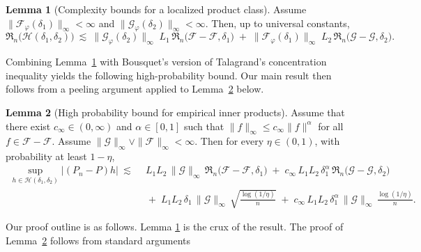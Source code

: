 \documentclass[11pt]{article}
\theoremstyle{plain}
\theoremstyle{definition} %
\newtheorem{lemma}{Lemma}
\begin{document}
\begin{lemma}[Complexity bounds for a localized product class]
\label{lem:nonselfnorm_lipschitz_product}
Assume $\|\mathcal F_{\varphi}(\delta_1)\|_\infty<\infty$ and $\|\mathcal G_{\varphi}(\delta_2)\|_\infty<\infty$.
Then, up to universal constants,
\[
\mathfrak R_n\bigl(\mathcal H(\delta_1,\delta_2)\bigr)
\ \lesssim\
\|\mathcal G_{\varphi}(\delta_2)\|_\infty\; L_1\,\mathfrak R_n\bigl(\mathcal F-\mathcal F,\delta_1\bigr)
\;+\;
\|\mathcal F_{\varphi}(\delta_1)\|_\infty\; L_2\,\mathfrak R_n\bigl(\mathcal G-\mathcal G,\delta_2\bigr).
\]
\end{lemma}

Combining Lemma~\ref{lem:nonselfnorm_lipschitz_product} with Bousquet's version of Talagrand's concentration inequality yields the following high-probability bound. Our main result then follows from a peeling argument applied to Lemma~\ref{lem:fixed_delta_local_conc_lipschitz_product_increments} below.


 
\begin{lemma}[High probability bound for empirical inner products]
\label{lem:fixed_delta_local_conc_lipschitz_product_increments}
Assume that there exist $c_\infty\in(0,\infty)$ and $\alpha\in[0,1]$ such that $\|f\|_\infty\le c_\infty\|f\|^\alpha$ for all  $ f\in\mathcal F-\mathcal F.$
Assume $\|\mathcal G\|_\infty \vee \|\mathcal F\|_\infty<\infty$.
Then for every $\eta\in(0,1)$, with probability at least $1-\eta$,
\begin{align}
\label{eq:fixed_delta_local_conc_lipschitz_product_increments}
\sup_{h\in\mathcal H(\delta_1,\delta_2)} |(P_n-P)h|
\ \lesssim\
&\ L_1L_2\,\|\mathcal G\|_\infty \,\mathfrak R_n\bigl(\mathcal F-\mathcal F,\delta_1\bigr)
\;+\;
c_\infty\,L_1L_2\,\delta_1^{\alpha}\,\mathfrak R_n\bigl(\mathcal G-\mathcal G,\delta_2\bigr)\nonumber\\
&\;+\;
L_1L_2\,\delta_1\,\|\mathcal G\|_\infty\,
\sqrt{\frac{\log(1/\eta)}{n}}
\;+\;
c_\infty\,L_1L_2\,\delta_1^{\alpha}\,\|\mathcal G\|_\infty\,
\frac{\log(1/\eta)}{n}.
\end{align}
\end{lemma}



Our proof outline is as follows. Lemma \ref{lem:nonselfnorm_lipschitz_product} is the crux of the result. The proof of Lemma~\ref{lem:fixed_delta_local_conc_lipschitz_product_increments} follows from standard arguments 
 
 
\end{document}
